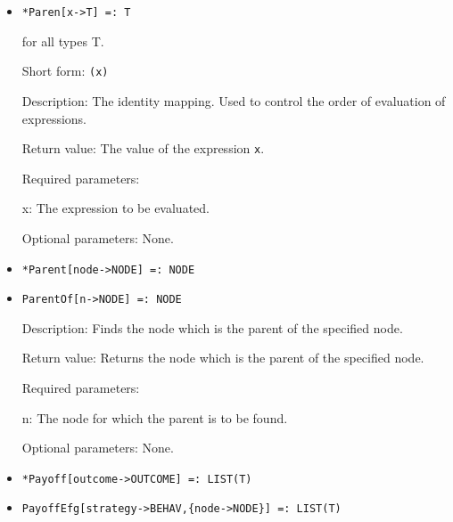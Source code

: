 \begin{itemize}

\item
\protect \large \begin{verbatim}
*Paren[x->T] =: T
\end{verbatim}\normalsize

for all types T.

\bd
\item
[Short form:] \verb+(x)+
\item
[Description:] The identity mapping.  Used to control the order of evaluation
of expressions.
\item
[Return value:] The value of the expression \verb+x+.
\item
[Required parameters:]\hfil\null
\bd
\item
[x:] The expression to be evaluated.
\ed
\item
[Optional parameters:] None.
\ed

\item
\protect \large \begin{verbatim}
*Parent[node->NODE] =: NODE
\end{verbatim}\normalsize

\item
\protect \large \begin{verbatim}
ParentOf[n->NODE] =: NODE
\end{verbatim}\normalsize

\bd
\item
[Description:] Finds the node which is the parent of the specified
node.
\item
[Return value:] Returns the node which is the parent of the specified
node.
\item
[Required parameters:]\hfil\null
	
\bd
\item
[n:] The node for which the parent is to be found.
\ed

\item
[Optional parameters:] None.
\ed

\item
\protect \large \begin{verbatim}
*Payoff[outcome->OUTCOME] =: LIST(T)
\end{verbatim}\normalsize

\item
\protect \large \begin{verbatim}
PayoffEfg[strategy->BEHAV,{node->NODE}] =: LIST(T)
\end{verbatim}\normalsize


\end{itemize}
